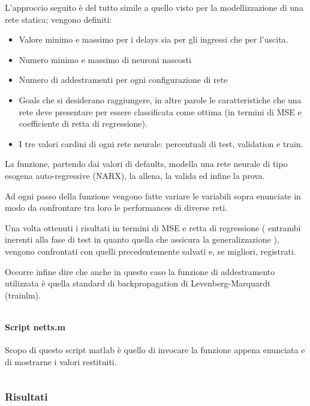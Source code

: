 L'approccio seguito è del tutto simile a quello visto per la modellizzazione di una rete statica; vengono definiti:

\begin{itemize}
  \item Valore minimo e massimo per i delays sia per gli ingressi che per l'uscita.
  \item Numero minimo e massimo di neuroni nascosti
  \item Numero di addestramenti per ogni configurazione di rete
  \item Goals che si desiderano raggiungere, in altre parole le caratteristiche che una rete deve presentare per essere classificata come ottima (in termini di MSE e coefficiente di retta di regressione).
  \item I tre valori cardini di ogni rete neurale: percentuali di test, validation e train.
\end{itemize}

La funzione, partendo dai valori di defaults, modella una rete neurale di tipo esogena auto-regressive (NARX), la allena, la valida ed infine la prova.

Ad ogni passo della funzione vengono fatte variare le variabili sopra enunciate in modo da confrontare tra loro le performances di diverse reti.

Una volta ottenuti i risultati in termini di MSE e retta di regressione ( entrambi inerenti alla fase di test in quanto quella che assicura la generalizzazione ), vengono confrontati con quelli precedentemente salvati e, se migliori, registrati.

Occorre infine dire che anche in questo caso la funzione di addestramento utilizzata è quella standard di backpropagation di Levenberg-Marquardt (trainlm).

\inputminted[linenos=true,fontsize=\footnotesize]{matlab}{../../src/time\ series/functions/searchBestTimeSeries.m}


\paragraph{Script netts.m}
Scopo di questo script matlab è quello di invocare la funzione appena enunciata e di mostrarne i valori restituiti.

\inputminted[linenos=true,fontsize=\footnotesize]{matlab}{../../src/netts.m}


\subsubsection{Risultati}

